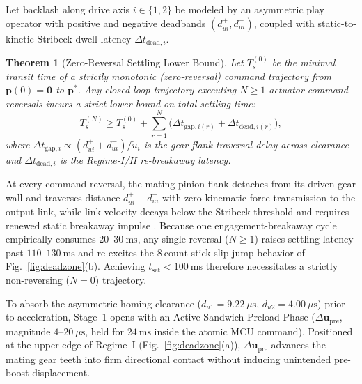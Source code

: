 \documentclass[journal]{IEEEtran}
\newtheorem{theorem}{Theorem}
\begin{document}
Let backlash along drive axis $i \in \{1, 2\}$ be modeled by an asymmetric play operator with positive and negative deadbands $(d_{ui}^+, d_{ui}^-)$, coupled with static-to-kinetic Stribeck dwell latency $\Delta t_{\text{dead},i}$.

\begin{theorem}[Zero-Reversal Settling Lower Bound]
Let $T_s^{(0)}$ be the minimal transit time of a strictly monotonic (zero-reversal) command trajectory from $\mathbf{p}(0) = \mathbf{0}$ to $\mathbf{p}^*$. Any closed-loop trajectory executing $N \ge 1$ actuator command reversals incurs a strict lower bound on total settling time:
\begin{equation}
T_s^{(N)} \ge T_s^{(0)} + \sum_{r=1}^{N} \big(\Delta t_{\text{gap},i(r)} + \Delta t_{\text{dead},i(r)}\big),
\end{equation}
where $\Delta t_{\text{gap},i} \propto (d_{ui}^+ + d_{ui}^-)/\dot{u}_i$ is the gear-flank traversal delay across clearance and $\Delta t_{\text{dead},i}$ is the Regime-I/II re-breakaway latency.
\end{theorem}

\begin{IEEEproof}
At every command reversal, the mating pinion flank detaches from its driven gear wall and traverses distance $d_{ui}^+ + d_{ui}^-$ with zero kinematic force transmission to the output link, while link velocity decays below the Stribeck threshold and requires renewed static breakaway impulse \cite{armstrong1994survey,nordin2002controlling}. Because one engagement-breakaway cycle empirically consumes $20\text{--}30\ \text{ms}$, any single reversal ($N \ge 1$) raises settling latency past $110\text{--}130\ \text{ms}$ and re-excites the $8\ \text{count}$ stick-slip jump behavior of Fig.~\ref{fig:deadzone}(b). Achieving $t_{\text{set}} < 100\ \text{ms}$ therefore necessitates a strictly non-reversing ($N = 0$) trajectory.
\end{IEEEproof}

To absorb the asymmetric homing clearance ($d_{u1} = 9.22\ \mu\text{s}$, $d_{u2} = 4.00\ \mu\text{s}$) prior to acceleration, Stage~1 opens with an Active Sandwich Preload Phase ($\Delta\mathbf{u}_{\text{pre}}$, magnitude $4\text{--}20\ \mu\text{s}$, held for $24\ \text{ms}$ inside the atomic MCU command). Positioned at the upper edge of Regime~I (Fig.~\ref{fig:deadzone}(a)), $\Delta\mathbf{u}_{\text{pre}}$ advances the mating gear teeth into firm directional contact without inducing unintended pre-boost displacement.
\end{document}
